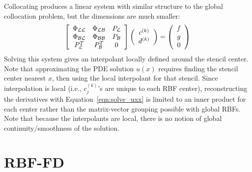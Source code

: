 \documentclass{report}
\begin{document}
{Collocating produces a linear system with similar structure to the global collocation problem, but the dimensions are much smaller:
\begin{eqnarray}
\left[ \begin{array}{c c c} 
	\Phi_{\mathcal{L}\mathcal{L}} & \Phi_{\mathcal{L}\mathcal{B}} & P_{\mathcal{L}} \\
	\Phi_{\mathcal{B}\mathcal{L}} & \Phi_{\mathcal{B}\mathcal{B}} & P_{\mathcal{B}} \\
	P^T_{\mathcal{L}} & P^T_{\mathcal{B}} & 0 \\
	\end{array} \right] \left( \begin{array}{c}
							{c}^{(k)} \\
							{d}^{(k)}
							 \end{array}
						 \right) = \left( \begin{array}{c}
							{f} \\
							{g} \\
							0
							 \end{array}
						 \right) 
	\label{eqn:local_method}
\end{eqnarray}
Solving this system gives an interpolant locally defined around the stencil center. Note that approximating the PDE solution $u(x)$ requires finding the stencil center nearest $x$, then using the local interpolant for that stencil. Since interpolation is local (i.e., $c_j^{(k)}$'s are unique to each RBF center), reconstructing the derivatives with Equation~\ref{eqn:solve_uxx} is limited to an inner product for each center rather than the matrix-vector grouping possible with global RBFs.  
Note that because the interpolants are local, there is no notion of global continuity/smoothness of the solution.


\section{RBF-FD}

}
\end{document}
